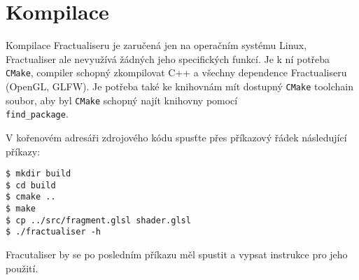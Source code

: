 \section{Kompilace}
Kompilace Fractualiseru je zaručená jen na operačním systému Linux,
Fractualiser ale nevyužívá žádných jeho specifických funkcí.
Je k ní potřeba \texttt{CMake}, compiler schopný zkompilovat C++ a
všechny dependence Fractualiseru (OpenGL, GLFW). Je potřeba také
ke knihovnám mít dostupný \texttt{CMake} toolchain soubor, aby byl 
\texttt{CMake} schopný najít knihovny pomocí \\\texttt{find\_package}.


V kořenovém adresáři zdrojového kódu spu\-sťte přes příkazový řádek
následující příkazy:
\begin{lstlisting}
$ mkdir build
$ cd build
$ cmake ..
$ make
$ cp ../src/fragment.glsl shader.glsl
$ ./fractualiser -h
\end{lstlisting}

Fracutaliser by se po posledním příkazu měl spustit a vypsat
instrukce pro jeho použití.
